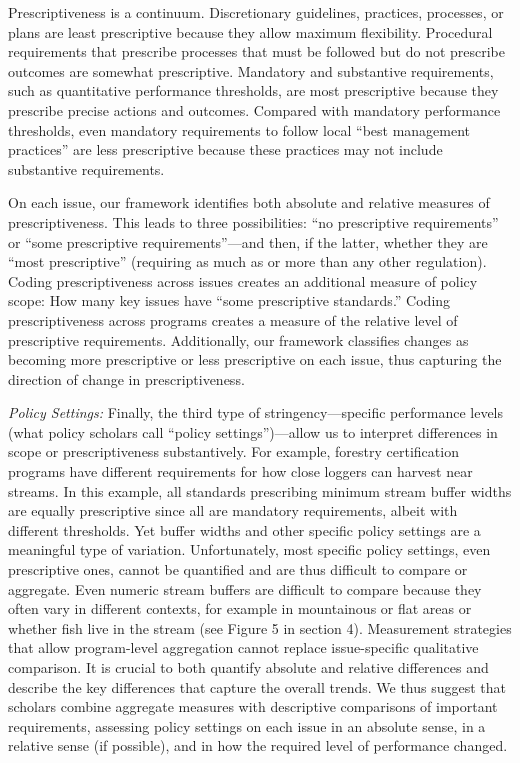 \documentclass[
      12pt,
            Review ]{article}
\begin{document}
Prescriptiveness is a continuum. Discretionary guidelines, practices, processes, or plans are least prescriptive because they allow maximum flexibility. Procedural requirements that prescribe processes that must be followed but do not prescribe outcomes are somewhat prescriptive. Mandatory and substantive requirements, such as quantitative performance thresholds, are most prescriptive because they prescribe precise actions and outcomes. Compared with mandatory performance thresholds, even mandatory requirements to follow local ``best management practices'' are less prescriptive because these practices may not include substantive requirements.

On each issue, our framework identifies both absolute and relative measures of prescriptiveness. This leads to three possibilities: ``no prescriptive requirements'' or ``some prescriptive requirements''---and then, if the latter, whether they are ``most prescriptive'' (requiring as much as or more than any other regulation). Coding prescriptiveness across issues creates an additional measure of policy scope: How many key issues have ``some prescriptive standards.'' Coding prescriptiveness across programs creates a measure of the relative level of prescriptive requirements. Additionally, our framework classifies changes as becoming more prescriptive or less prescriptive on each issue, thus capturing the direction of change in prescriptiveness.



\emph{Policy Settings:} Finally, the third type of stringency---specific performance levels (what policy scholars call ``policy settings'')---allow us to interpret differences in scope or prescriptiveness substantively. For example, forestry certification programs have different requirements for how close loggers can harvest near streams. In this example, all standards prescribing minimum stream buffer widths are equally prescriptive since all are mandatory requirements, albeit with different thresholds. Yet buffer widths and other specific policy settings are a meaningful type of variation. Unfortunately, most specific policy settings, even prescriptive ones, cannot be quantified and are thus difficult to compare or aggregate. Even numeric stream buffers are difficult to compare because they often vary in different contexts, for example in mountainous or flat areas or whether fish live in the stream (see Figure 5 in section 4). Measurement strategies that allow program-level aggregation cannot replace issue-specific qualitative comparison. It is crucial to both quantify absolute and relative differences and describe the key differences that capture the overall trends. We thus suggest that scholars combine aggregate measures with descriptive comparisons of important requirements, assessing policy settings on each issue in an absolute sense, in a relative sense (if possible), and in how the required level of performance changed.
\end{document}

